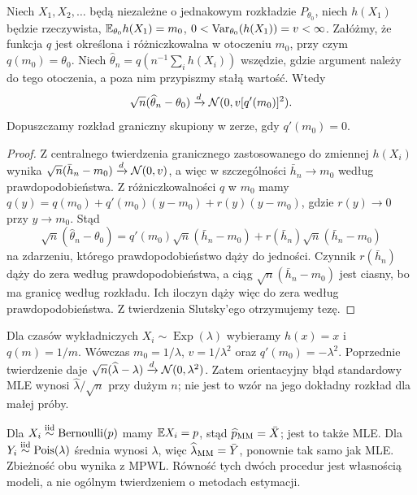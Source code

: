 \begin{twierdzenie}
\label{thm:mom-clt}
Niech $X_1,X_2,\ldots$ będą niezależne o jednakowym rozkładzie
$P_{\theta_0}$, niech $h(X_1)$ będzie rzeczywista,
$\mathbb E_{\theta_0}h(X_1)=m_0$, $0<\operatorname{Var}_{\theta_0}(h(X_1))=v<\infty$.
Załóżmy, że funkcja $q$ jest określona i różniczkowalna w otoczeniu
$m_0$, przy czym $q(m_0)=\theta_0$. Niech
$\widehat\theta_n=q(n^{-1}\sum_i h(X_i))$ wszędzie, gdzie argument
należy do tego otoczenia, a poza nim przypiszmy stałą wartość.
Wtedy
\[
\sqrt n(\widehat\theta_n-\theta_0)
\xrightarrow{d}\mathcal N(0,v[q'(m_0)]^2).
\]
Dopuszczamy rozkład graniczny skupiony w zerze, gdy $q'(m_0)=0$.
\end{twierdzenie}
\begin{proof}
Z centralnego twierdzenia granicznego zastosowanego do zmiennej
$h(X_i)$ wynika
$\sqrt n(\bar h_n-m_0)\xrightarrow{d}\mathcal N(0,v)$,
a więc w szczególności $\bar h_n\to m_0$ według
prawdopodobieństwa. Z różniczkowalności $q$ w $m_0$ mamy
$q(y)=q(m_0)+q'(m_0)(y-m_0)+r(y)(y-m_0)$,
gdzie $r(y)\to0$ przy $y\to m_0$.
Stąd
\[
\sqrt n(\widehat\theta_n-\theta_0)
=q'(m_0)\sqrt n(\bar h_n-m_0)
+r(\bar h_n)\sqrt n(\bar h_n-m_0)
\]
na zdarzeniu, którego prawdopodobieństwo dąży do jedności.
Czynnik $r(\bar h_n)$ dąży do zera według prawdopodobieństwa,
a ciąg $\sqrt n(\bar h_n-m_0)$ jest ciasny, bo ma granicę
według rozkładu. Ich iloczyn dąży więc do zera według
prawdopodobieństwa. Z twierdzenia Slutsky'ego otrzymujemy tezę.
\end{proof}
\begin{przyklad}
Dla czasów wykładniczych $X_i\sim\operatorname{Exp}(\lambda)$
wybieramy $h(x)=x$ i $q(m)=1/m$. Wówczas
$m_0=1/\lambda$, $v=1/\lambda^2$ oraz
$q'(m_0)=-\lambda^2$. Poprzednie twierdzenie daje
$\sqrt n(\widehat\lambda-\lambda)\xrightarrow{d}
\mathcal N(0,\lambda^2)$. Zatem orientacyjny błąd standardowy MLE
wynosi $\widehat\lambda/\sqrt n$ przy dużym $n$;
nie jest to wzór na jego dokładny rozkład dla małej próby.
\end{przyklad}

\begin{przyklad}
Dla $X_i\mathrel{\overset{\mathrm{iid}}\sim}\operatorname{Bernoulli}(p)$ mamy $\mathbb E X_i=p$, stąd
$\widehat p_{\rm MM}=\bar X$; jest to także MLE.
Dla $Y_i\mathrel{\overset{\mathrm{iid}}\sim}\operatorname{Pois}(\lambda)$ średnia wynosi $\lambda$, więc
$\widehat\lambda_{\rm MM}=\bar Y$, ponownie tak samo jak MLE.
Zbieżność obu wynika z MPWL. Równość tych dwóch procedur jest
własnością modeli, a nie ogólnym twierdzeniem o metodach estymacji.
\end{przyklad}

